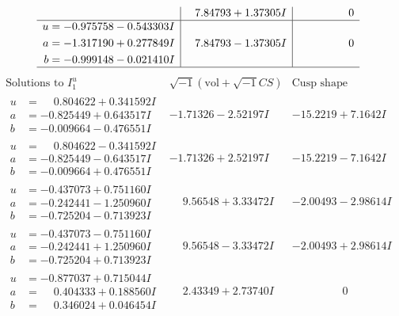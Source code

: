 \documentclass[1p]{elsarticle_modified}
\theoremstyle{definition}
\newcommand{\I}{\sqrt{-1}}
\begin{document}
$$\begin{array}{c|c|c}
 & \phantom{-}7.84793 + 1.37305 I & \phantom{-0.000000 } 0 \\ \hline\begin{aligned}
u &= -0.975758 - 0.543303 I \\
a &= -1.317190 + 0.277849 I \\
b &= -0.999148 - 0.021410 I\end{aligned}
 & \phantom{-}7.84793 - 1.37305 I & \phantom{-0.000000 } 0\\
 \hline 
 \end{array}$$\newpage$$\begin{array}{c|c|c}  
\text{Solutions to }I^u_{1}& \I (\text{vol} + \sqrt{-1}CS) & \text{Cusp shape}\\
 \hline 
\begin{aligned}
u &= \phantom{-}0.804622 + 0.341592 I \\
a &= -0.825449 + 0.643517 I \\
b &= -0.009664 - 0.476551 I\end{aligned}
 & -1.71326 - 2.52197 I & -15.2219 + 7.1642 I \\ \hline\begin{aligned}
u &= \phantom{-}0.804622 - 0.341592 I \\
a &= -0.825449 - 0.643517 I \\
b &= -0.009664 + 0.476551 I\end{aligned}
 & -1.71326 + 2.52197 I & -15.2219 - 7.1642 I \\ \hline\begin{aligned}
u &= -0.437073 + 0.751160 I \\
a &= -0.242441 - 1.250960 I \\
b &= -0.725204 - 0.713923 I\end{aligned}
 & \phantom{-}9.56548 + 3.33472 I & -2.00493 - 2.98614 I \\ \hline\begin{aligned}
u &= -0.437073 - 0.751160 I \\
a &= -0.242441 + 1.250960 I \\
b &= -0.725204 + 0.713923 I\end{aligned}
 & \phantom{-}9.56548 - 3.33472 I & -2.00493 + 2.98614 I \\ \hline\begin{aligned}
u &= -0.877037 + 0.715044 I \\
a &= \phantom{-}0.404333 + 0.188560 I \\
b &= \phantom{-}0.346024 + 0.046454 I\end{aligned}
 & \phantom{-}2.43349 + 2.73740 I & \phantom{-0.000000 } 0 \\ \hline\begin{aligned}

\end{aligned}
\end{array}$$
\end{document}
